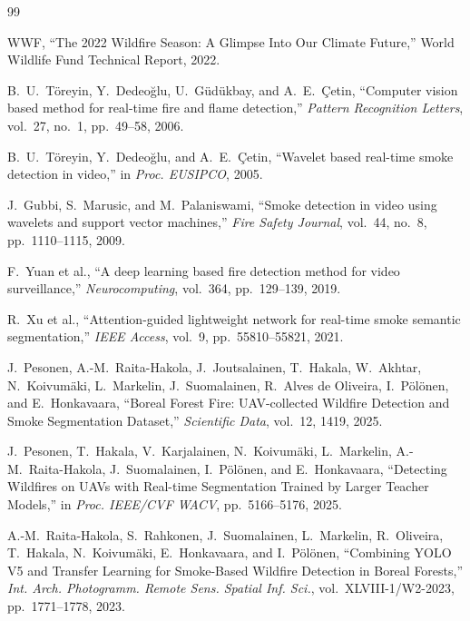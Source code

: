 \documentclass[10pt,twocolumn]{article}
\begin{document}
\begin{thebibliography}{99}

WWF, ``The 2022 Wildfire Season: A Glimpse Into Our Climate Future,'' World Wildlife Fund Technical Report, 2022.

B.~U.~T{\"o}reyin, Y.~Dedeo{\u{g}}lu, U.~G{\"u}d{\"u}kbay, and A.~E.~{\c{C}}etin, ``Computer vision based method for real-time fire and flame detection,'' \textit{Pattern Recognition Letters}, vol.~27, no.~1, pp.~49--58, 2006.

B.~U.~T{\"o}reyin, Y.~Dedeo{\u{g}}lu, and A.~E.~{\c{C}}etin, ``Wavelet based real-time smoke detection in video,'' in \textit{Proc. EUSIPCO}, 2005.

J.~Gubbi, S.~Marusic, and M.~Palaniswami, ``Smoke detection in video using wavelets and support vector machines,'' \textit{Fire Safety Journal}, vol.~44, no.~8, pp.~1110--1115, 2009.

F.~Yuan et al., ``A deep learning based fire detection method for video surveillance,'' \textit{Neurocomputing}, vol.~364, pp.~129--139, 2019.

R.~Xu et al., ``Attention-guided lightweight network for real-time smoke semantic segmentation,'' \textit{IEEE Access}, vol.~9, pp.~55810--55821, 2021.

J.~Pesonen, A.-M.~Raita-Hakola, J.~Joutsalainen, T.~Hakala, W.~Akhtar, N.~Koivum{\"a}ki, L.~Markelin, J.~Suomalainen, R.~Alves de Oliveira, I.~P{\"o}l{\"o}nen, and E.~Honkavaara, ``Boreal Forest Fire: UAV-collected Wildfire Detection and Smoke Segmentation Dataset,'' \textit{Scientific Data}, vol.~12, 1419, 2025.

J.~Pesonen, T.~Hakala, V.~Karjalainen, N.~Koivum{\"a}ki, L.~Markelin, A.-M.~Raita-Hakola, J.~Suomalainen, I.~P{\"o}l{\"o}nen, and E.~Honkavaara, ``Detecting Wildfires on UAVs with Real-time Segmentation Trained by Larger Teacher Models,'' in \textit{Proc. IEEE/CVF WACV}, pp.~5166--5176, 2025.

A.-M.~Raita-Hakola, S.~Rahkonen, J.~Suomalainen, L.~Markelin, R.~Oliveira, T.~Hakala, N.~Koivum{\"a}ki, E.~Honkavaara, and I.~P{\"o}l{\"o}nen, ``Combining YOLO V5 and Transfer Learning for Smoke-Based Wildfire Detection in Boreal Forests,'' \textit{Int. Arch. Photogramm. Remote Sens. Spatial Inf. Sci.}, vol.~XLVIII-1/W2-2023, pp.~1771--1778, 2023.


\end{thebibliography}
\end{document}
